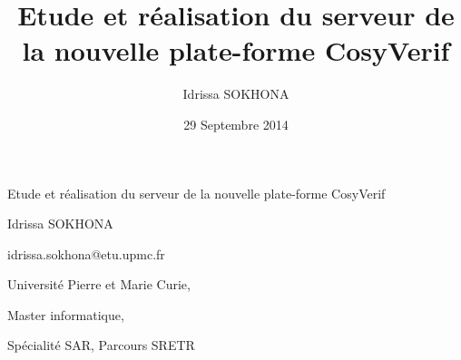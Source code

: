 \documentclass[t, english]{beamer}
\begin{document}
\title{Etude et réalisation du serveur de la nouvelle plate-forme CosyVerif}
\author{Idrissa SOKHONA}
\date{29 Septembre 2014}

\LobsterTwo

\begin{frame}
\begin{center}

\par
\Huge Etude et réalisation du serveur de la nouvelle plate-forme CosyVerif

\par
\normalsize
\textsf{Idrissa SOKHONA}

\par
\textsf{idrissa.sokhona@etu.upmc.fr}

\par
\textsf{Université Pierre et Marie Curie,}

\par
\textsf{Master informatique,}

\par
\textsf{Spécialité SAR, Parcours SRETR}

\end{center}
\end{frame}
\end{document}
